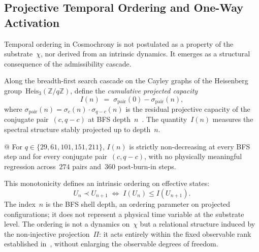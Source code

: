 \subsection{Projective Temporal Ordering and One-Way Activation}
  \label{subsec:monotonicity-and-arrow-of-time}

  Temporal ordering in Cosmochrony is not postulated as a property of the
  substrate~$\chi$, nor derived from an intrinsic dynamics.
  It emerges as a structural consequence of the admissibility cascade.

  Along the breadth-first search cascade on the Cayley graphs of the Heisenberg
  group~$\mathrm{Heis}_3(\mathbb{Z}/q\mathbb{Z})$, define the \emph{cumulative
projected capacity}
  \begin{equation}
    I(n) \;=\; \sigma_{\mathrm{pair}}(0) - \sigma_{\mathrm{pair}}(n),
  \end{equation}
  where $\sigma_{\mathrm{pair}}(n) = \sigma_c(n)\cdot\sigma_{q-c}(n)$ is the
  residual projective capacity of the conjugate pair~$(c,q{-}c)$ at BFS
  depth~$n$~\cite{Beau2026a28}.
  The quantity~$I(n)$ measures the spectral structure stably projected up to
  depth~$n$.

  \begin{proposition}
@  For $q \in \{29, 61, 101, 151, 211\}$, $I(n)$ is strictly non-decreasing at every
  BFS step and for every conjugate pair~$(c,q{-}c)$, with no physically
  meaningful regression across~$274$ pairs and~$360$ post-burn-in steps.
  \end{proposition}

  This monotonicity defines an intrinsic ordering on effective states:
  \begin{equation}
    U_n \prec U_{n+1}
    \;\Longleftrightarrow\;
    I(U_n) \le I(U_{n+1}).
  \end{equation}
  The index~$n$ is the BFS shell depth, an ordering parameter on projected
  configurations; it does not represent a physical time variable at the
  substrate level.
  The ordering is not a dynamics on~$\chi$ but a relational structure induced
  by the non-injective projection~$\Pi$: it acts entirely within the fixed
  observable rank established in~\cite{Beau2026a28}, without enlarging the
  observable degrees of freedom.

